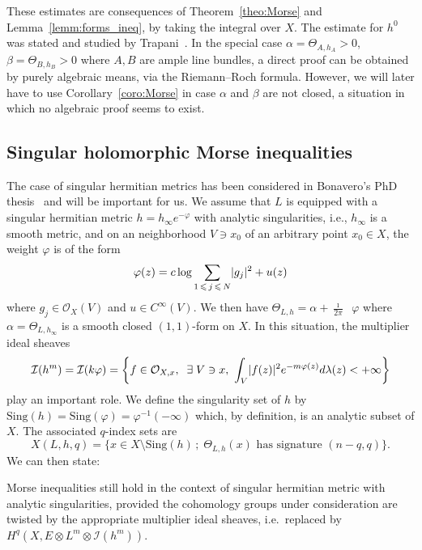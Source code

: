 \documentclass[AHL,Unicode,longabstracts,published]{cedram}
\DeclareMathOperator{\ddbar}{\partial\bar\partial}
\DeclarePairedDelimiter{\abs}{\lvert}{\rvert}
\newcommand*\Sing{\mathrm{Sing}}
\newcommand*\cI{\mathcal{I}}
\newcommand*\cO{\mathcal{O}}
\let\leq\leqslant
\let\oldexists\exists
\renewcommand*{\exists}{\mathrel{\oldexists}}
\begin{document}
\begin{rema}
These estimates are consequences of Theorem~\ref{theo:Morse} and Lemma~\ref{lemm:forms_ineq}, by taking the integral over $X$. The estimate for $h^0$ was stated and studied by Trapani~\cite{Tra95}. In the special case $\alpha=\Theta_{A,h_A}>0$,
$\beta=\Theta_{B,h_B}>0$ where $A,B$ are ample line bundles, a direct proof can be obtained by purely algebraic means, via the Riemann--Roch formula. However, we will later have to use Corollary~\ref{coro:Morse} in case $\alpha$ and $\beta$ are not closed, a situation in which no algebraic proof seems to exist.
\end{rema}


\subsection{Singular holomorphic Morse inequalities}
The case of singular hermitian metrics has been considered in Bonavero's PhD thesis~\cite{Bon93} and will be important for us. We assume that $L$ is equipped with a singular hermitian metric $h=h_\infty e^{-\varphi}$ with analytic singularities, i.e., $h_\infty$ is a smooth metric, and on an neighborhood $V\ni x_0$ of an arbitrary point $x_0\in X$, the weight
$\varphi$ is of the form
\begin{equation}\label{eq:weight}
\varphi(z) = c\log\sum_{1\,\leq\,j\,\leq\,N}\abs{g_j}^2+u(z)
\end{equation}
where $g_j\in\cO_X(V)$ and $u\in C^\infty(V)$. We then have
$\Theta_{L,h}=\alpha+\tfrac{\imath}{ 2\pi}\ddbar\varphi$ where
$\alpha=\Theta_{L,h_\infty}$ is a smooth closed $(1,1)$-form on $X$. In this situation, the multiplier ideal sheaves
\[
\cI(h^m)=\cI(k\varphi)=\left\{f\in\cO_{X,x},\;\;\exists V\ni x,~
\int_V\abs{f(z)}^2e^{-m\varphi(z)}d\lambda(z)<+\infty\right\}
\]
play an important role. We define the singularity set of $h$ by
$\Sing(h)=\Sing(\varphi)=\varphi^{-1}(-\infty)$ which, by definition, is an analytic subset of $X$. The associated $q$-index sets are
\[
X(L,h,q) =
\big\{ x\in X\setminus\Sing(h)
\,;\;
\Theta_{L,h}(x)\text{ has signature }(n-q,q)
\big\}.
\]
We can then state:
\begin{theo}\label{theo:Bonavero}
Morse inequalities still hold in the context of singular hermitian metric with analytic singularities, provided the cohomology groups under consideration are twisted by the appropriate multiplier ideal sheaves, i.e.\ replaced by $H^q(X,E\otimes L^m\otimes\cI(h^m))$.
\end{theo}
\end{document}
